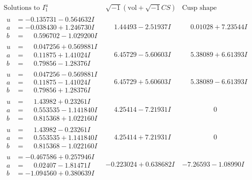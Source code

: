 \documentclass[1p]{elsarticle_modified}
\theoremstyle{definition}
\newcommand{\I}{\sqrt{-1}}
\begin{document}
$$\begin{array}{c|c|c}
\text{Solutions to }I^u_{1}& \I (\text{vol} + \sqrt{-1}CS) & \text{Cusp shape}\\
 \hline 
\begin{aligned}
u &= -0.135731 - 0.564632 I \\
a &= -0.038430 + 1.246730 I \\
b &= \phantom{-}0.596702 - 1.029200 I\end{aligned}
 & \phantom{-}1.44493 - 2.51937 I & \phantom{-}0.01028 + 7.23544 I \\ \hline\begin{aligned}
u &= \phantom{-}0.047256 + 0.569881 I \\
a &= \phantom{-}0.11875 + 1.41024 I \\
b &= \phantom{-}0.79856 - 1.28376 I\end{aligned}
 & \phantom{-}6.45729 - 5.60603 I & \phantom{-}5.38089 + 6.61393 I \\ \hline\begin{aligned}
u &= \phantom{-}0.047256 - 0.569881 I \\
a &= \phantom{-}0.11875 - 1.41024 I \\
b &= \phantom{-}0.79856 + 1.28376 I\end{aligned}
 & \phantom{-}6.45729 + 5.60603 I & \phantom{-}5.38089 - 6.61393 I \\ \hline\begin{aligned}
u &= \phantom{-}1.43982 + 0.23261 I \\
a &= \phantom{-}0.553535 - 1.141840 I \\
b &= \phantom{-}0.815368 + 1.022160 I\end{aligned}
 & \phantom{-}4.25414 - 7.21931 I & \phantom{-0.000000 } 0 \\ \hline\begin{aligned}
u &= \phantom{-}1.43982 - 0.23261 I \\
a &= \phantom{-}0.553535 + 1.141840 I \\
b &= \phantom{-}0.815368 - 1.022160 I\end{aligned}
 & \phantom{-}4.25414 + 7.21931 I & \phantom{-0.000000 } 0 \\ \hline\begin{aligned}
u &= -0.467586 + 0.257946 I \\
a &= \phantom{-}0.02407 - 1.81471 I \\
b &= -1.094560 + 0.380639 I\end{aligned}
 & -0.223024 + 0.638682 I & -7.26593 - 1.08990 I \\ \hline\begin{aligned}

\end{aligned}
\end{array}$$
\end{document}
